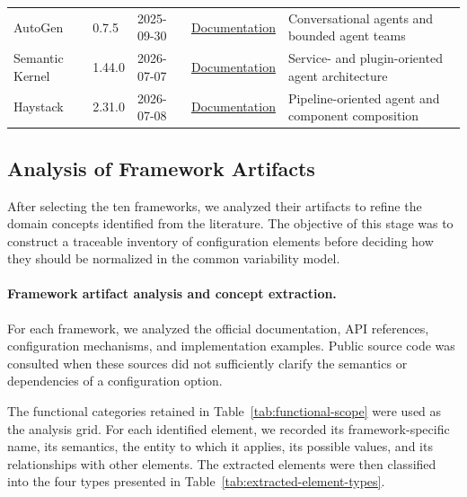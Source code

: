\begin{table}[t]
\begin{tabular}{
        @{}
        p{}
        p{}
        p{}
        p{}
        p{}
        @{}
    }
        AutoGen
        & 0.7.5
        & 2025-09-30
        & \href{https://microsoft.github.io/autogen/stable/user-guide/agentchat-user-guide/index.html}
        {Documentation}
        & Conversational agents and bounded agent teams \\

        Semantic Kernel
        & 1.44.0
        & 2026-07-07
        & \href{https://learn.microsoft.com/en-us/semantic-kernel/frameworks/agent/}
        {Documentation}
        & Service- and plugin-oriented agent architecture \\

        Haystack
        & 2.31.0
        & 2026-07-08
        & \href{https://docs.haystack.deepset.ai/docs/intro}
        {Documentation}
        & Pipeline-oriented agent and component composition \\

        \bottomrule
    \end{tabular}
\end{table}

\subsection{Analysis of Framework Artifacts}
\label{subsec:framework-artifact-analysis}

After selecting the ten frameworks, we analyzed their artifacts to refine the
domain concepts identified from the literature. The objective of this stage was
to construct a traceable inventory of configuration elements before deciding
how they should be normalized in the common variability model.


\paragraph{\textbf{Framework artifact analysis and concept extraction.}}
For each framework, we analyzed the official documentation, API references,
configuration mechanisms, and implementation examples. Public source code was
consulted when these sources did not sufficiently clarify the semantics or
dependencies of a configuration option.

The functional categories retained in Table~\ref{tab:functional-scope} were used
as the analysis grid. For each identified element, we recorded its
framework-specific name, its semantics, the entity to which it applies, its
possible values, and its relationships with other elements. The extracted
elements were then classified into the four types presented in
Table~\ref{tab:extracted-element-types}.

